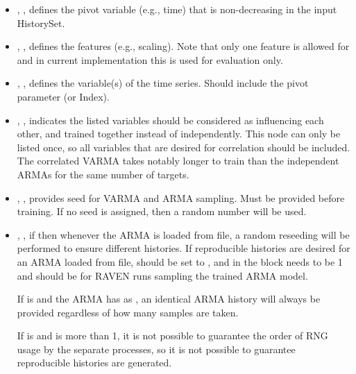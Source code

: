 \begin{itemize}
  \item {}, , defines the pivot variable (e.g., time) that is non-decreasing in
  the input HistorySet.
  \item {}, , defines the features (e.g., scaling). Note that only
  one feature is allowed for  and in current implementation this is used for evaluation only.
  \item {}, , defines the variable(s) of the
    time series.  Should include the pivot parameter (or Index).
  \item {}, , indicates the listed variables
    should be considered as influencing each other, and trained together instead of independently.  This node
    can only be listed once, so all variables that are desired for correlation should be included.  \nb The
    correlated VARMA takes notably longer to train than the independent ARMAs for the same number of targets.
  \item {}, , provides seed for VARMA and ARMA sampling.
   Must be provided before training. If no seed is assigned,
   then a random number will be used.

   \item {}, , if  then whenever the ARMA is loaded from file, a
    random reseeding will be performed to ensure different histories. \nb If reproducible histories are desired for an ARMA loaded from file,
     should be set to , and in the  block  needs to be 1
    and  should be
      for RAVEN runs sampling the trained ARMA model.

If  is  and the ARMA has  as , an identical ARMA history will always be provided regardless of how many samples are taken.

If  is  and  is more than 1, it is not possible to guarantee the order of RNG usage by the separate processes, so it is not possible to guarantee reproducible histories are generated.        


\end{itemize}
